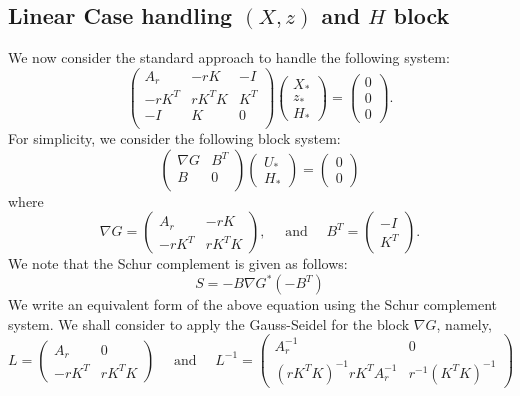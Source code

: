 \begin{itemize}
\subsection{Linear Case handling $(X,z)$ and $H$ block} 
We now consider the standard approach to handle the following system: 
\begin{equation}
\begin{pmatrix}
A_r & - r K & -I \\
-r K^T& r K^TK & K^T\\
-I& K & 0\\
\end{pmatrix}
\begin{pmatrix}
X_*\\
z_* \\
H_*
\end{pmatrix} = 
\begin{pmatrix}
0\\
0\\
0
\end{pmatrix}. 
\end{equation}
For simplicity, we consider the following block system: 
\begin{equation}
\begin{pmatrix}
\nabla G  & B^T \\
B  & 0\\
\end{pmatrix} 
\begin{pmatrix}
U_* \\
H_*
\end{pmatrix} = 
\begin{pmatrix}
0\\
0
\end{pmatrix}
\end{equation}
where 
\begin{equation}
\nabla G = \begin{pmatrix}
A_r & -r K\\
-r K^T & rK^T K
\end{pmatrix}, \quad \mbox{ and } \quad 
B^T = \begin{pmatrix}
-I \\K^T
\end{pmatrix}.
\end{equation}
We note that the Schur complement is given as follows:   
\begin{equation}
S = -B \nabla G^{*} (-B^T) 
\end{equation}
We write an equivalent form of the above equation using the Schur complement system. We shall consider to apply the Gauss-Seidel for the block $\nabla G$, namely, 
\begin{equation}
L = \begin{pmatrix}
A_r & 0\\
-r K^T & rK^T K 
\end{pmatrix} 
\quad \mbox{ and } \quad L^{-1} = \begin{pmatrix}
A_r^{-1} & 0\\
(rK^T K)^{-1} rK^T A_r^{-1} & r^{-1} (K^T K)^{-1} 
\end{pmatrix} 
\end{equation}


\end{itemize}
